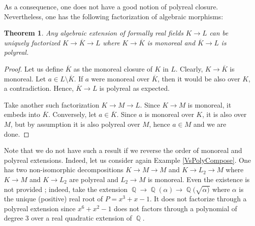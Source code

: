 \documentclass[12pt]{amsart}
\newtheorem{thm}{Theorem}[section]
\theoremstyle{definition}
\newtheorem{rem}[thm]{Remark}
\DeclareMathOperator{\QQ}{\mathbb Q}
\begin{document}
	

As a consequence, one does not have a good notion of polyreal closure. Nevertheless, one has the following factorization of algebraic morphisms:



\begin{thm}\label{FactorMonoAnti} Any algebraic extension of formally real fields $K\to L$ can be uniquely factorized $K\to \overline{K}\to L$ where $K\to \overline{K}$ is monoreal and $\overline{K}\to L$ is polyreal. \end{thm}
\begin{proof}
Let us define $\overline{K}$ as the monoreal closure of $K$ in $L$. Clearly, $K\to \overline{K}$ is monoreal. Let $a\in L\setminus \overline{K}$. If $a$ were monoreal over $\overline{K}$, then it would be also over $K$, a contradiction. Hence, $\overline{K}\to L$ is polyreal as expected.

Take another such factorization 
$K\to M\to L$. Since $K\to M$ is monoreal, it embeds into $\overline{K}$. Conversely, let $a\in \overline{K}$. Since $a$ is monoreal over $K$, it is also over $M$, but by assumption it is also polyreal over $M$, hence $a\in M$ and we are done.
\end{proof}

Note that we do not have such a result if we reverse the order of monoreal and polyreal extensions. Indeed, let us consider again Example \ref{VsPolyCompose}. One has 
two non-isomorphic decompositions $K\to M\to M$ and $K\to L_2\to M$ where $K\to M$ and $K\to L_2$ are polyreal and $L_2\to M$ is monoreal. Even the existence is not provided ; indeed, take the extension $\QQ\to\QQ(\alpha)\to \QQ(\sqrt{\alpha)}$ where $\alpha$ is the unique (positive) real root of $P=x^3+x-1$.
It does not factorize through a polyreal extension since $x^6+x^2-1$ does not factors through a polynomial of degree $3$ over a real quadratic extension of $\QQ$.

\end{document}
